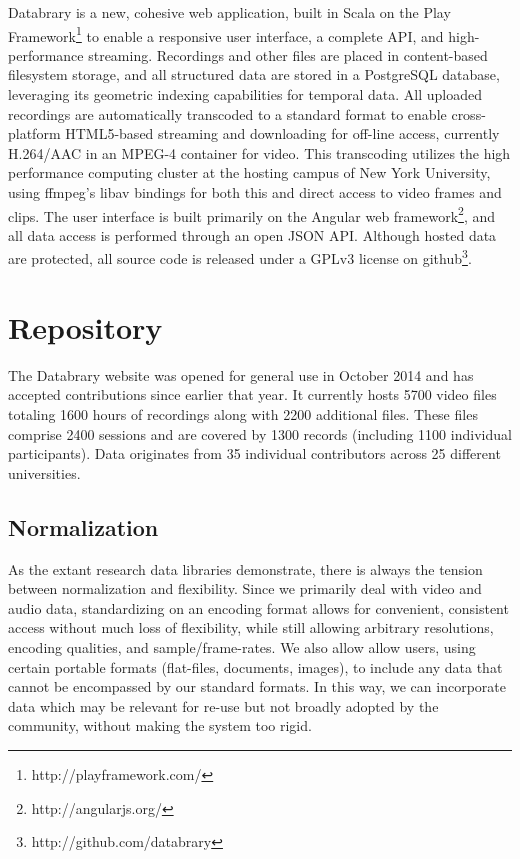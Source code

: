 \documentclass{sig-alternate}
\begin{document}
Databrary is a new, cohesive web application, built in Scala on the Play Framework\footnote{http://playframework.com/} to enable a responsive user interface, a complete API, and high-performance streaming.
Recordings and other files are placed in content-based filesystem storage, and all structured data are stored in a PostgreSQL database, leveraging its geometric indexing capabilities for temporal data.
All uploaded recordings are automatically transcoded to a standard format to enable cross-platform HTML5-based streaming and downloading for off-line access, currently H.264/AAC in an MPEG-4 container for video.
This transcoding utilizes the high performance computing cluster at the hosting campus of New York University, using ffmpeg's libav bindings for both this and direct access to video frames and clips.
The user interface is built primarily on the Angular web framework\footnote{http://angularjs.org/}, and all data access is performed through an open JSON API.
Although hosted data are protected, all source code is released under a GPLv3 license on github\footnote{http://github.com/databrary}.

\section{Repository}

The Databrary website was opened for general use in October 2014 and has accepted contributions since earlier that year.
It currently hosts 5700 video files totaling 1600 hours of recordings along with 2200 additional files.
These files comprise 2400 sessions and are covered by 1300 records (including 1100 individual participants).
Data originates from 35 individual contributors across 25 different universities.

\subsection{Normalization}

As the extant research data libraries demonstrate, there is always the tension between normalization and flexibility.
Since we primarily deal with video and audio data, standardizing on an encoding format allows for convenient, consistent access without much loss of flexibility, while still allowing arbitrary resolutions, encoding qualities, and sample/frame-rates.
We also allow allow users, using certain portable formats (flat-files, documents, images), to include any data that cannot be encompassed by our standard formats.
In this way, we can incorporate data which may be relevant for re-use but not broadly adopted by the community, without making the system too rigid.
\end{document}
